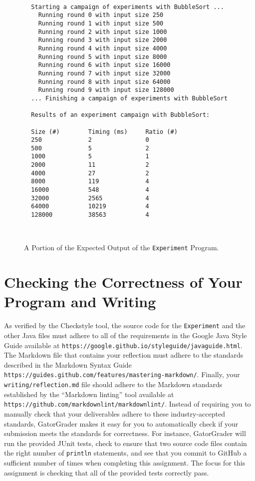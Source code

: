 \documentclass[11pt]{article}
\newcommand{\mainprogram}{\lstinline{Experiment}}
\newcommand{\reflection}{\lstinline{writing/reflection.md}}
\newcommand{\program}[1]{\lstinline{#1}}
\newcommand{\url}[1]{\lstinline{#1}}
\newcommand{\step}[1]{``{#1}''}
\begin{document}
\begin{figure}[t]
  \centering
  \begin{verbatim}

  Starting a campaign of experiments with BubbleSort ...
    Running round 0 with input size 250
    Running round 1 with input size 500
    Running round 2 with input size 1000
    Running round 3 with input size 2000
    Running round 4 with input size 4000
    Running round 5 with input size 8000
    Running round 6 with input size 16000
    Running round 7 with input size 32000
    Running round 8 with input size 64000
    Running round 9 with input size 128000
  ... Finishing a campaign of experiments with BubbleSort

  Results of an experiment campaign with BubbleSort:

  Size (#)        Timing (ms)     Ratio (#)
  250             2               0
  500             5               2
  1000            5               1
  2000            11              2
  4000            27              2
  8000            119             4
  16000           548             4
  32000           2565            4
  64000           10219           4
  128000          38563           4
  \end{verbatim}
  \vspace*{-.35in}
  \caption{A Portion of the Expected Output of the \mainprogram{} Program.}~\label{fig:output}
  \vspace*{-.25in}
\end{figure}

\section*{Checking the Correctness of Your Program and Writing}

As verified by the Checkstyle tool, the source code for the \mainprogram{} and
the other Java files must adhere to all of the requirements in the Google Java
Style Guide available at
\url{https://google.github.io/styleguide/javaguide.html}. The Markdown file that
contains your reflection must adhere to the standards described in the Markdown
Syntax Guide \url{https://guides.github.com/features/mastering-markdown/}.
Finally, your \reflection{} file should adhere to the Markdown standards
established by the \step{Markdown linting} tool available at
\url{https://github.com/markdownlint/markdownlint/}. Instead of requiring you to
manually check that your deliverables adhere to these industry-accepted
standards, GatorGrader makes it easy for you to automatically check if your
submission meets the standards for correctness. For instance, GatorGrader will
run the provided JUnit tests, check to ensure that two source code files contain
the right number of \program{println} statements, and see that you commit to
GitHub a sufficient number of times when completing this assignment. The focus
for this assignment is checking that all of the provided tests correctly pass.
\end{document}
